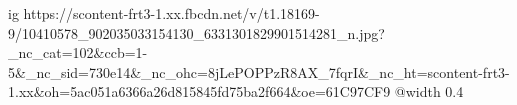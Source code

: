  
 
 
 
 

\ifcmt
  ig https://scontent-frt3-1.xx.fbcdn.net/v/t1.18169-9/10410578_902035033154130_6331301829901514281_n.jpg?_nc_cat=102&ccb=1-5&_nc_sid=730e14&_nc_ohc=8jLePOPPzR8AX_7fqrI&_nc_ht=scontent-frt3-1.xx&oh=5ac051a6366a26d815845fd75ba2f664&oe=61C97CF9
  @width 0.4
\fi
